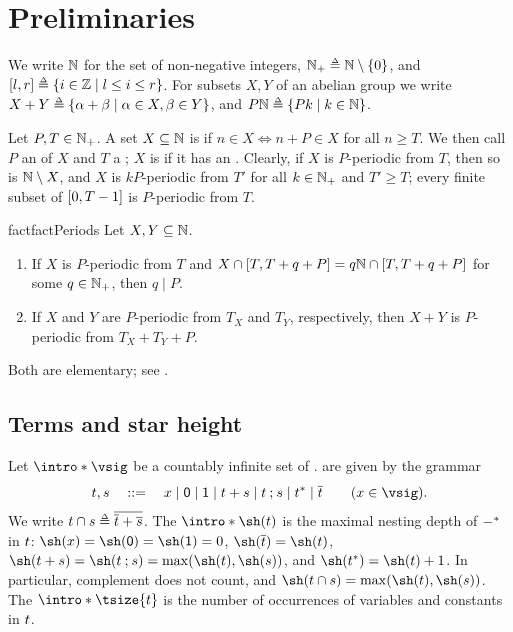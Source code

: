 \section{Preliminaries}\label{section: preliminaries}

We write $\mathbb{N}$ for the set of non-negative integers, $\pnat \defeq \nat \setminus \set{0}$, and $\range{l, r} \defeq \set{i \in \inte \mid l \le i \le r}$.
For subsets $X, Y$ of an abelian group we write $X + Y \defeq \set{\alpha + \beta \mid \alpha \in X, \beta \in Y}$, and $P\nat \defeq \set{P k \mid k \in \nat}$.

\AP Let $P, T \in \mathbb{N}_{+}$. A set $X \subseteq \mathbb{N}$ is  if $n \in X \Leftrightarrow n + P \in X$ for all $n \ge T$.
We then call $P$ an  of $X$ and $T$ a ; $X$ is  if it has an .
Clearly, if $X$ is $P$-periodic from $T$, then so is $\mathbb{N} \setminus X$, and $X$ is $kP$-periodic from $T'$ for all $k \in \mathbb{N}_{+}$ and $T' \ge T$; every finite subset of $[0, T - 1]$ is $P$-periodic from $T$.
\begin{restatable}{fact}{factPeriods}\label{fact: periods}
    Let $X, Y \subseteq \mathbb{N}$.
    \begin{enumerate}
        \item\label{fact: periods: min} If $X$ is $P$-periodic from $T$ and $X \cap [T, T + q + P] = q \mathbb{N} \cap [T, T + q + P]$ for some $q \in \mathbb{N}_{+}$, then $q \mid P$.
        \item\label{fact: periods: sum} If $X$ and $Y$ are $P$-periodic from $T_X$ and $T_Y$, respectively, then $X + Y$ is $P$-periodic from $T_X + T_Y + P$.
    \end{enumerate}
\end{restatable}
Both are elementary; see .

\subsection{Terms and star height}\label{section: terms}
\AP Let $\intro*\vsig$ be a countably infinite set of .
 are given by the grammar
\[\term[1], \term[2] \quad::=\quad x \mid \emp \mid \id \mid \term[1] \union \term[2] \mid \term[1] \compo \term[2] \mid \term[1]^{*} \mid \com{\term[1]} \qquad (x \in \vsig).\]
We write $\term[1] \inter \term[2] \defeq \com{\com{\term[1]} \union \com{\term[2]}}$.
\AP The  $\intro*\sh(\term)$ is the maximal nesting depth of ${-}^{*}$ in $\term$:
$\sh(x) = \sh(\emp) = \sh(\id) = 0$, $\sh(\com{\term}) = \sh(\term)$, $\sh(\term[1] \union \term[2]) = \sh(\term[1] \compo \term[2]) = \max(\sh(\term[1]), \sh(\term[2]))$, and $\sh(\term^{*}) = \sh(\term) + 1$.
In particular, complement does not count, and $\sh(\term[1] \inter \term[2]) = \max(\sh(\term[1]), \sh(\term[2]))$.
\AP The  $\intro*\tsize{\term}$ is the number of occurrences of variables and constants in $\term$.

